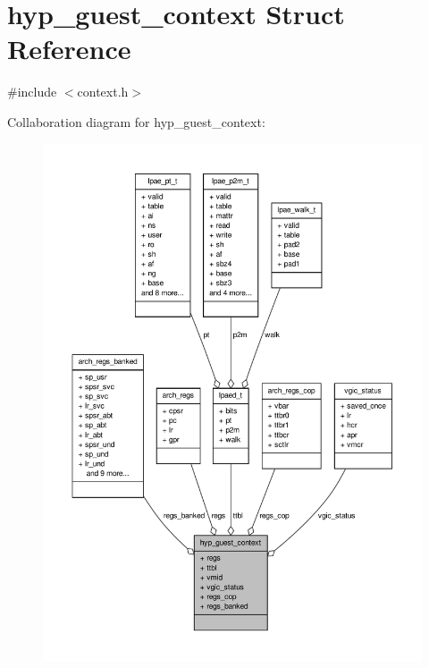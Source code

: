 \hypertarget{structhyp__guest__context}{\section{hyp\-\_\-guest\-\_\-context \-Struct \-Reference}
\label{structhyp__guest__context}
}


{\ttfamily \#include $<$context.\-h$>$}



\-Collaboration diagram for hyp\-\_\-guest\-\_\-context\-:
\nopagebreak
\begin{figure}[H]
\begin{center}
\leavevmode
\includegraphics[width=350pt]{structhyp__guest__context__coll__graph}
\end{center}
\end{figure}
